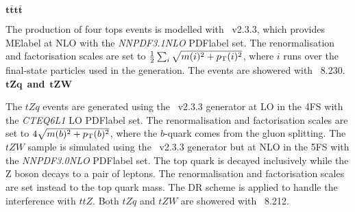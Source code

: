 \textit{$\bm{t\bar{t}t\bar{t}}$}

The production of four tops events is modelled with \MGMCatNLO~v2.3.3, which provides \acrshort{MElabel} at NLO with the \textit{NNPDF3.1NLO} \acrshort{PDFlabel} set. The renormalisation and factorisation scales are set to $\frac{1}{2}\sum_i\sqrt{m(i)^2+p_{\text{T}}(i)^2}$, where $i$ runs over the final-state particles used in the generation. The events are showered with \PYTHIA~8.230.\\

\textit{$\bm{tZq}$}~\textbf{and}~\textit{$\bm{tZW}$}

The $tZq$ events are generated using the \MGMCatNLO~v2.3.3 generator at LO in the 4FS with the \textit{CTEQ6L1} LO \acrshort{PDFlabel} set. The renormalisation and factorisation scales are set to $4\sqrt{m(b)^2+p_{\text{T}}(b)^2}$, where the $b$-quark comes from the gluon splitting.
The $tZW$ sample is simulated using the \MGMCatNLO~v2.3.3 generator but at NLO in the 5FS with the \textit{NNPDF3.0NLO} \acrshort{PDFlabel} set. The top quark is decayed inclusively while the Z boson decays to a pair of leptons. The renormalisation and factorisation scales are set instead to the top quark mass. The DR scheme is applied to handle the interference with $ttZ$. Both $tZq$ and $tZW$ are showered with \PYTHIA~8.212.